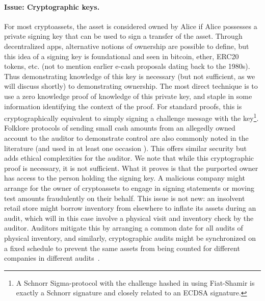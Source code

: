 \paragraph{Issue: Cryptographic keys.} For most cryptoassets, the asset is considered owned by Alice if Alice possesses a private signing key that can be used to sign a transfer of the asset. Through decentralized apps, alternative notions of ownership are possible to define, but this idea of a signing key is foundational and seen in bitcoin, ether, ERC20 tokens, etc. (not to mention earlier e-cash proposals dating back to the 1980s). Thus demonstrating knowledge of this key is necessary (but not sufficient, as we will discuss shortly) to demonstrating ownership. The most direct technique is to use a zero knowledge proof of knowledge of this private key, and staple in some information identifying the context of the proof. For standard proofs, this is cryptographically equivalent to simply signing a challenge message with the key\footnote{A Schnorr Sigma-protocol with the challenge hashed in using Fiat-Shamir is exactly a Schnorr signature and closely related to an ECDSA signature.}. Folklore protocols of sending small cash amounts from an allegedly owned account to the auditor to demonstrate control are also commonly noted in the literature (and used in at least one occasion \todo{[cite]}). This offers similar security but adds ethical complexities for the auditor.
We note that while this cryptographic proof is necessary, it is not sufficient. What it proves is that the purported owner has access to the person holding the signing key. A malicious company might arrange for the owner of cryptoassets to engage in signing statements or moving test amounts fraudulently on their behalf. This issue is not new: an insolvent retail store might borrow inventory from elsewhere to inflate its assets during an audit, which will in this case involve a physical visit and inventory check by the auditor. Auditors mitigate this by arranging a common date for all audits of physical inventory, and similarly, cryptographic audits might be synchronized on a fixed schedule to prevent the same assets from being counted for different companies in different audits~\cite{dagher2015provisions}. 


